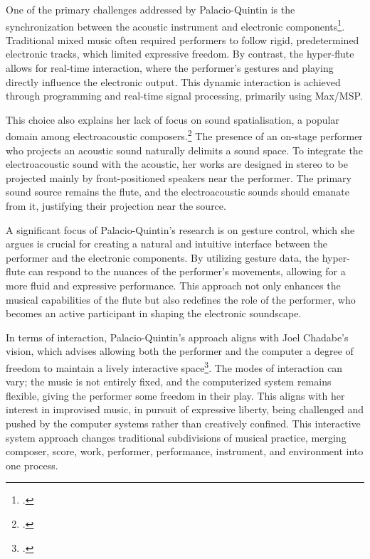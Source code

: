 \documentclass[12pt,twoside,maitrise]{dms_ks}
\theoremstyle{definition}
\begin{document}
{One of the primary challenges addressed by Palacio-Quintin is the synchronization between the acoustic instrument and electronic components\footcite{palacio-quintin_composition_2012-1}. 
Traditional mixed music often required performers to follow rigid, predetermined electronic tracks, which limited expressive freedom. 
By contrast, the hyper-flute allows for real-time interaction, where the performer's gestures and playing directly influence the electronic output. 
This dynamic interaction is achieved through programming and real-time signal processing, primarily using Max/MSP.

This choice also explains her lack of focus on sound spatialisation, a popular domain among electroacoustic composers.\footcite[50]{palacio-quintin_composition_2012-1} 
The presence of an on-stage performer who projects an acoustic sound naturally delimits a sound space. 
To integrate the electroacoustic sound with the acoustic, her works are designed in stereo to be projected mainly by front-positioned speakers near the performer. 
The primary sound source remains the flute, and the electroacoustic sounds should emanate from it, justifying their projection near the source.

A significant focus of Palacio-Quintin's research is on gesture control, which she argues is crucial for creating a natural and intuitive interface between the performer and the electronic components. 
By utilizing gesture data, the hyper-flute can respond to the nuances of the performer's movements, allowing for a more fluid and expressive performance. 
This approach not only enhances the musical capabilities of the flute but also redefines the role of the performer, who becomes an active participant in shaping the electronic soundscape.

In terms of interaction, Palacio-Quintin’s approach aligns with Joel Chadabe's vision, which advises allowing both the performer and the computer a degree of freedom to maintain a lively interactive space\footcite[23]{chadabe_interactive_1984}. 
The modes of interaction can vary; the music is not entirely fixed, and the computerized system remains flexible, giving the performer some freedom in their play. 
This aligns with her interest in improvised music, in pursuit of expressive liberty, being challenged and pushed by the computer systems rather than creatively confined. 
This interactive system approach changes traditional subdivisions of musical practice, merging composer, score, work, performer, performance, instrument, and environment into one process.

}
\end{document}
